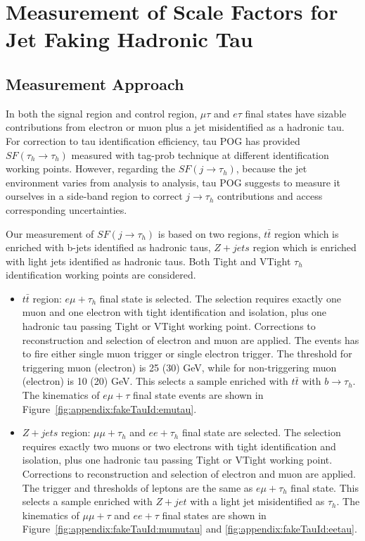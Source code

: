 

\section{Measurement of Scale Factors for Jet Faking Hadronic Tau}
\label{sec:app:jToTauhSF}


\subsection{Measurement Approach}
In both the signal region and control region, $\mu \tau$ and $e \tau$
final states have sizable contributions from electron or muon plus a jet
misidentified as a hadronic tau.  For correction to tau identification
efficiency, tau POG has provided $SF (\tau_h \to \tau_h)$ measured with
tag-prob technique at different identification working points.  However,
regarding the $SF (j \to \tau_h)$, because the jet environment varies from
analysis to analysis, tau POG suggests to measure it ourselves in a
side-band region to correct $j \to \tau_h$ contributions and access
corresponding uncertainties.

Our measurement of $SF (j\to \tau_h)$ is based on two regions,
$t\bar{t}$ region which is enriched with b-jets identified as hadronic
taus, $Z+jets$ region which is enriched with light jets identified as
hadronic taus. Both Tight and VTight $\tau_h$ identification working points
are considered.

\begin{itemize}
    \item $t\bar{t}$ region: $e\mu+\tau_h$ final state is selected. The selection requires
    exactly one muon and one electron with tight identification and
    isolation, plus one hadronic tau passing Tight or VTight working point.
    Corrections to reconstruction and selection of electron and muon are
    applied. The events has to fire either single muon trigger or single electron
    trigger.  The \pt threshold for triggering muon (electron) is 25 (30)
    GeV, while for non-triggering muon (electron) is 10 (20) GeV.  This
    selects a sample enriched with $t\bar{t}$ with $b \to \tau_h$. The kinematics of $e\mu+\tau$ final
    state events are shown in Figure~\ref{fig:appendix:fakeTauId:emutau}.
    
    
    \item $Z+jets$ region: $\mu\mu+\tau_h$ and $ee+\tau_h$ final state are selected.  The
    selection requires exactly two muons or two electrons with tight
    identification and isolation, plus one hadronic tau passing Tight or VTight
    working point.  Corrections to reconstruction and selection of
    electron and muon are applied.
    The trigger and \pt thresholds of leptons are the same as
    $e\mu+\tau_h$ final state.  This selects a sample enriched with $Z +
    jet$ with a light jet misidentified as $\tau_h$. The kinematics of $\mu\mu+\tau$ and
    $ee+\tau$ final states are shown in Figure~\ref{fig:appendix:fakeTauId:mumutau} and \ref{fig:appendix:fakeTauId:eetau}.
\end{itemize}

